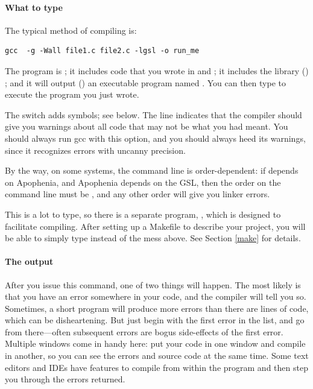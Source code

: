 \paragraph{What to type}
The typical method of compiling is:
\begin{lstlisting}
gcc  -g -Wall file1.c file2.c -lgsl -o run_me
\end{lstlisting}
The program is ; it includes code that you wrote in
 and ; it includes the library
() ;
and it will output () an executable program named . You
can then type  to execute the program you just wrote.

The  switch adds  symbols; see below.  The
 line indicates that the compiler should give you warnings
about all code that may not be what you had meant. You should always run
gcc with this option, and you should always heed its warnings, since it
recognizes errors with uncanny precision.

By the way, on some systems, the command line is order-dependent: if 
depends on Apophenia, and Apophenia depends on the GSL, then the order
on the command line must be ,
and any other order will give you linker errors. 

This is a lot to type, so there is a separate program, ,
which is designed to facilitate compiling. After setting up a Makefile
to describe your project, you will be able to simply type  instead
of the mess above. See Section \ref{make} for details.


\paragraph{The output} After you issue this command, one of two things
will happen. The most likely is that you have an error somewhere in your
code, and the compiler will tell you so. Sometimes, a short program
will produce more errors than there are lines of code, which can be
disheartening. But just begin with the first error in the list, and go
from there---often subsequent errors are bogus side-effects of the first
error. Multiple windows come in handy here: put your code in one window
and compile in another, so you can see the errors and source code at
the same time. Some text editors and IDEs have features to compile from
within the program and then step you through the errors returned.

